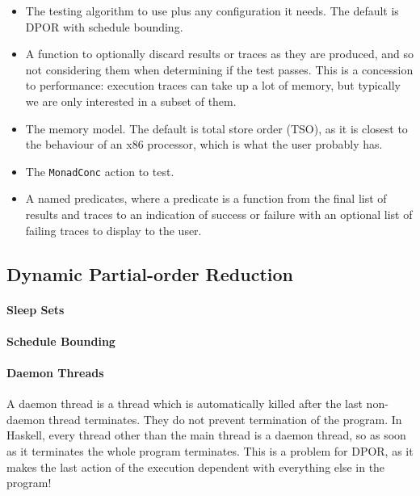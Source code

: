 \begin{itemize}
\item The testing algorithm to use plus any configuration it needs.
  The default is DPOR with schedule bounding.
\item A function to optionally discard results or traces as they are
  produced, and so not considering them when determining if the test
  passes.  This is a concession to performance: execution traces can
  take up a lot of memory, but typically we are only interested in a
  subset of them.
\item The memory model.  The default is total store order (TSO), as it
  is closest to the behaviour of an x86 processor\cite{owens2009},
  which is what the user probably has.
\item The \verb|MonadConc| action to test.
\item A named predicates, where a predicate is a function from the
  final list of results and traces to an indication of success or
  failure with an optional list of failing traces to display to the
  user.
\end{itemize}

\subsection{Dynamic Partial-order Reduction}



\paragraph{Sleep Sets}

\paragraph{Schedule Bounding}

\paragraph{Daemon Threads}
A daemon thread is a thread which is automatically killed after the
last non-daemon thread terminates.  They do not prevent termination of
the program.  In Haskell, every thread other than the main thread is a
daemon thread, so as soon as it terminates the whole program
terminates.  This is a problem for DPOR, as it makes the last action
of the execution dependent with everything else in the program!

